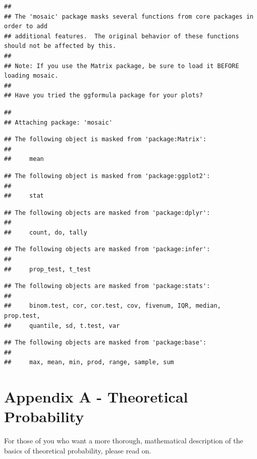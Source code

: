 \documentclass[
]{book}
\begin{document}
\begin{verbatim}
## 
## The 'mosaic' package masks several functions from core packages in order to add 
## additional features.  The original behavior of these functions should not be affected by this.
## 
## Note: If you use the Matrix package, be sure to load it BEFORE loading mosaic.
## 
## Have you tried the ggformula package for your plots?
\end{verbatim}

\begin{verbatim}
## 
## Attaching package: 'mosaic'
\end{verbatim}

\begin{verbatim}
## The following object is masked from 'package:Matrix':
## 
##     mean
\end{verbatim}

\begin{verbatim}
## The following object is masked from 'package:ggplot2':
## 
##     stat
\end{verbatim}

\begin{verbatim}
## The following objects are masked from 'package:dplyr':
## 
##     count, do, tally
\end{verbatim}

\begin{verbatim}
## The following objects are masked from 'package:infer':
## 
##     prop_test, t_test
\end{verbatim}

\begin{verbatim}
## The following objects are masked from 'package:stats':
## 
##     binom.test, cor, cor.test, cov, fivenum, IQR, median, prop.test,
##     quantile, sd, t.test, var
\end{verbatim}

\begin{verbatim}
## The following objects are masked from 'package:base':
## 
##     max, mean, min, prod, range, sample, sum
\end{verbatim}

\hypertarget{appendix-a---theoretical-probability}{%
\chapter{Appendix A - Theoretical Probability}\label{appendix-a---theoretical-probability}}

For those of you who want a more thorough, mathematical description of the basics of theoretical probability, please read on.
\end{document}
